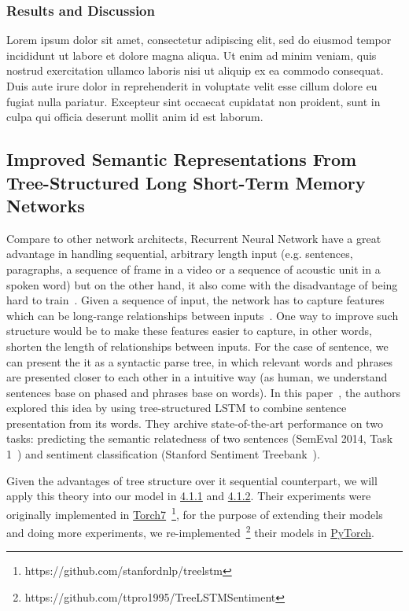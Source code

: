 \subsubsection{Results and Discussion}
Lorem ipsum dolor sit amet, consectetur adipiscing elit, sed do eiusmod tempor incididunt ut labore et dolore magna aliqua. Ut enim ad minim veniam, quis nostrud exercitation ullamco laboris nisi ut aliquip ex ea commodo consequat. Duis aute irure dolor in reprehenderit in voluptate velit esse cillum dolore eu fugiat nulla pariatur. Excepteur sint occaecat cupidatat non proident, sunt in culpa qui officia deserunt mollit anim id est laborum.

\subsection{Improved Semantic Representations From Tree-Structured Long Short-Term Memory Networks}
Compare to other network architects, Recurrent Neural Network have a great advantage in handling sequential, arbitrary length input (e.g. sentences, paragraphs, a sequence of frame in a video or a sequence of acoustic unit in a spoken word) but on the other hand, it also come with the disadvantage of being hard to train~\cite{hardRNN}.
Given a sequence of input, the network has to capture features which can be long-range relationships between inputs~\cite{socher2013recursive}.
One way to improve such structure would be to make these features easier to capture, in other words, shorten the length of relationships between inputs.
For the case of sentence, we can present the it as a syntactic parse tree, in which relevant words and phrases are presented closer to each other in a intuitive way (as human, we understand sentences base on phased and phrases base on words). 
In this paper~\cite{treeLSTM}, the authors explored this idea by using tree-structured LSTM to combine sentence presentation from its words.
They archive state-of-the-art performance on two tasks: predicting the semantic relatedness of two sentences (SemEval 2014, Task 1~\cite{SemeEvalTask1}) and sentiment classification (Stanford Sentiment Treebank~\cite{socher2013recursive}).


Given the advantages of tree structure over it sequential counterpart, we will apply this theory into our model in \hyperref[sec:VTtree]{4.1.1} and \hyperref[sec:CNNtree]{4.1.2}. 
Their experiments were originally implemented in \hyperref[sec:torch]{Torch7}~\footnote{https://github.com/stanfordnlp/treelstm}, for the purpose of extending their models and doing more experiments, we re-implemented~\footnote{https://github.com/ttpro1995/TreeLSTMSentiment} their models in \hyperref[sec:pytorch]{PyTorch}. 

